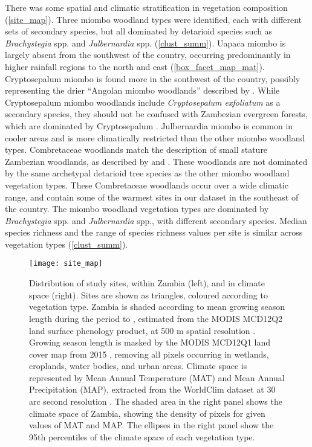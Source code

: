 \documentclass[11pt,a4paper]{article}
\begin{document}
There was some spatial and climatic stratification in vegetation composition
(\autoref{site_map}). Three miombo woodland types were identified, each with
different sets of secondary species, but all dominated by detarioid species
such as \textit{Brachystegia} spp. and \textit{Julbernardia} spp.
(\autoref{clust_summ}). Uapaca miombo is largely absent from the southwest of
the country, occurring predominantly in higher rainfall regions to the north
and east (\autoref{box_facet_map_mat}). Cryptosepalum miombo is found more in
the southwest of the country, possibly representing the drier ``Angolan miombo
woodlands'' described by \citet{White1983}. While Cryptosepalum miombo
woodlands include \textit{Cryptosepalum exfoliatum} as a secondary species,
they should not be confused with Zambezian evergreen forests, which are
dominated by Cryptosepalum \citep{White1983}. Julbernardia miombo is common in
cooler areas and is more climatically restricted than the other miombo woodland
types. Combretaceae woodlands match the description of small stature Zambezian
woodlands, as described by \citet{Dinerstein2017} and \citet{Chidumayo2001}.
These woodlands are not dominated by the same archetypal detarioid tree species
as the other miombo woodland vegetation types. These Combretaceae woodlands
occur over a wide climatic range, and contain some of the warmest sites in our
dataset in the southeast of the country. The miombo woodland vegetation types
are dominated by \textit{Brachystegia} spp. and \textit{Julbernardia} spp.,
with different secondary species. Median species richness and the range of
species richness values per site is similar across vegetation types
(\autoref{clust_summ}). 

\begin{figure}[H]
\centering
	\texttt{[image: site\_map]}
	\caption{Distribution of study sites, within Zambia (left), and in climate
		space (right). Sites are shown as triangles, coloured according to
		vegetation type. Zambia is shaded according to mean growing season length
		during the period \modisStart{} to \modisEnd{}, estimated from the MODIS
		MCD12Q2 land surface phenology product, at 500 m spatial resolution
		\citep{MCD12Q2}. Growing season length is masked by the MODIS MCD12Q1 land
		cover map from 2015 \citep{MCD12Q1}, removing all pixels occurring in wetlands,
		croplands, water bodies, and urban areas. Climate space is represented by Mean
		Annual Temperature (MAT) and Mean Annual Precipitation (MAP), extracted from
		the WorldClim dataset at 30 arc second resolution \citep{Fick2017}. The shaded
		area in the right panel shows the climate space of Zambia, showing the density
		of pixels for given values of MAT and MAP. The ellipses in the right panel show
		the 95th percentiles of the climate space of each vegetation type.} 
	\label{site_map}
\end{figure}
\end{document}
